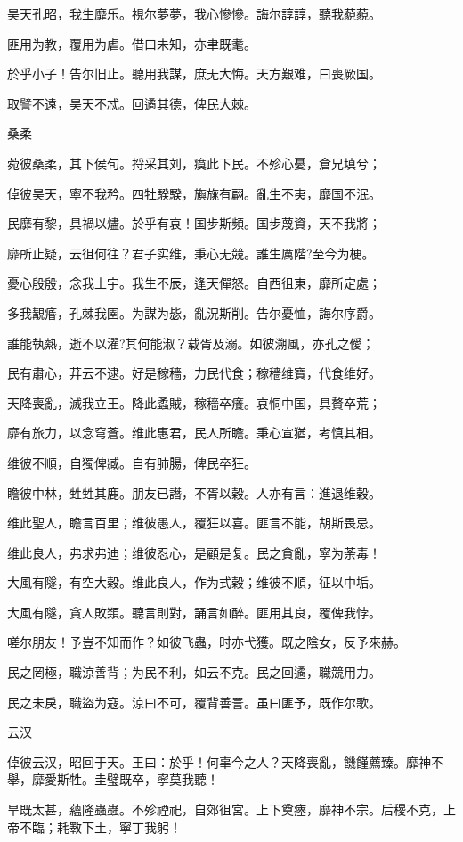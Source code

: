 昊天孔昭，我生靡乐。視尔夢夢，我心慘慘。誨尔諄諄，聽我藐藐。

匪用为教，覆用为虐。借曰未知，亦聿既耄。

於乎小子！告尔旧止。聽用我謀，庶无大悔。天方艱难，曰喪厥国。

取譬不遠，昊天不忒。回遹其德，俾民大棘。

桑柔

菀彼桑柔，其下侯旬。捋采其刘，瘼此下民。不殄心憂，倉兄填兮；

倬彼昊天，寧不我矜。四牡騤騤，旟旐有翩。亂生不夷，靡国不泯。

民靡有黎，具禍以燼。於乎有哀！国步斯頻。国步蔑資，天不我將；

靡所止疑，云徂何往？君子实维，秉心无競。誰生厲階?至今为梗。

憂心殷殷，念我土宇。我生不辰，逢天僤怒。自西徂東，靡所定處；

多我覯痻，孔棘我圉。为謀为毖，亂況斯削。告尔憂恤，誨尔序爵。

誰能執熱，逝不以濯?其何能淑？载胥及溺。如彼溯風，亦孔之僾；

民有肅心，荓云不逮。好是稼穡，力民代食；稼穡维寶，代食维好。

天降喪亂，滅我立王。降此蟊賊，稼穡卒癢。哀恫中国，具贅卒荒；

靡有旅力，以念穹蒼。维此惠君，民人所瞻。秉心宣猶，考慎其相。

维彼不順，自獨俾臧。自有肺腸，俾民卒狂。

瞻彼中林，甡甡其鹿。朋友已譖，不胥以穀。人亦有言：進退维穀。

维此聖人，瞻言百里；维彼愚人，覆狂以喜。匪言不能，胡斯畏忌。

维此良人，弗求弗迪；维彼忍心，是顧是复。民之貪亂，寧为荼毒！

大風有隧，有空大穀。维此良人，作为式穀；维彼不順，征以中垢。

大風有隧，貪人敗類。聽言則對，誦言如醉。匪用其良，覆俾我悖。

嗟尔朋友！予豈不知而作？如彼飞蟲，时亦弋獲。既之陰女，反予來赫。

民之罔極，職涼善背；为民不利，如云不克。民之回遹，職競用力。

民之未戾，職盜为寇。涼曰不可，覆背善詈。虽曰匪予，既作尔歌。

云汉

倬彼云汉，昭回于天。王曰：於乎！何辜今之人？天降喪亂，饑饉薦臻。靡神不舉，靡愛斯牲。圭璧既卒，寧莫我聽！

旱既太甚，蘊隆蟲蟲。不殄禋祀，自郊徂宮。上下奠瘞，靡神不宗。后稷不克，上帝不臨；耗斁下土，寧丁我躬！

